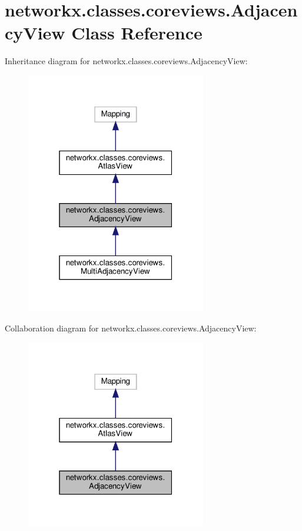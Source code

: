 \hypertarget{classnetworkx_1_1classes_1_1coreviews_1_1AdjacencyView}{}\section{networkx.\+classes.\+coreviews.\+Adjacency\+View Class Reference}
\label{classnetworkx_1_1classes_1_1coreviews_1_1AdjacencyView}


Inheritance diagram for networkx.\+classes.\+coreviews.\+Adjacency\+View\+:
\nopagebreak
\begin{figure}[H]
\begin{center}
\leavevmode
\includegraphics[width=223pt]{classnetworkx_1_1classes_1_1coreviews_1_1AdjacencyView__inherit__graph}
\end{center}
\end{figure}


Collaboration diagram for networkx.\+classes.\+coreviews.\+Adjacency\+View\+:
\nopagebreak
\begin{figure}[H]
\begin{center}
\leavevmode
\includegraphics[width=223pt]{classnetworkx_1_1classes_1_1coreviews_1_1AdjacencyView__coll__graph}
\end{center}
\end{figure}
